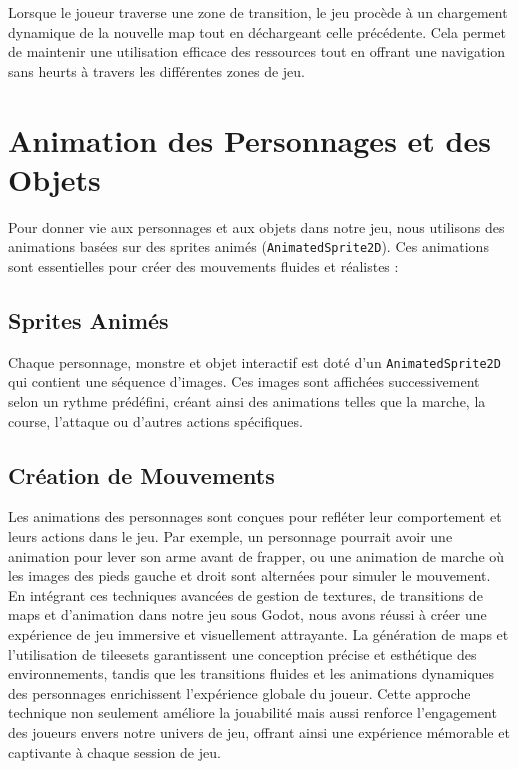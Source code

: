 Lorsque le joueur traverse une zone de transition, le jeu procède à un chargement dynamique de la nouvelle map tout en 
déchargeant celle précédente. Cela permet de maintenir une utilisation efficace des ressources tout en offrant une navigation sans heurts à 
travers les différentes zones de jeu.

\section*{Animation des Personnages et des Objets}

Pour donner vie aux personnages et aux objets dans notre jeu, nous utilisons des animations basées sur des sprites animés
 (\texttt{AnimatedSprite2D}). Ces animations sont essentielles pour créer des mouvements fluides et réalistes :

\subsection*{Sprites Animés}

Chaque personnage, monstre et objet interactif est doté d'un \texttt{AnimatedSprite2D} qui contient une séquence d'images. 
Ces images sont affichées successivement selon un rythme prédéfini, créant ainsi des animations telles que la marche, la course, l'attaque ou d'autres actions spécifiques.

\subsection{Création de Mouvements}

Les animations des personnages sont conçues pour refléter leur comportement et leurs actions dans le jeu. Par exemple, 
un personnage pourrait avoir une animation pour lever son arme avant de frapper, ou une animation de marche 
où les images des pieds gauche et droit sont alternées pour simuler le mouvement.
\\

En intégrant ces techniques avancées de gestion de textures, de transitions de maps et d'animation dans
 notre jeu sous Godot, nous avons réussi à créer une expérience de jeu immersive et visuellement attrayante. La génération de maps et l'utilisation de 
 tileesets garantissent une conception précise et esthétique des environnements, tandis que les transitions
  fluides et les animations dynamiques des personnages enrichissent l'expérience globale du joueur. Cette approche technique non seulement 
  améliore la jouabilité mais aussi renforce l'engagement des joueurs envers notre univers de jeu, 
offrant ainsi une expérience mémorable et captivante à chaque session de jeu.






